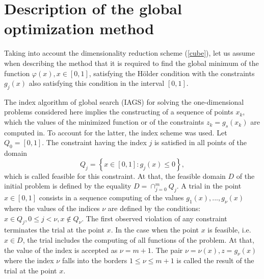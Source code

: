 \documentclass[runningheads]{llncs}
\begin{document}
\section{Description of the global optimization method}
\label{sec:method}

Taking into account the dimensionality reduction scheme (\ref{cube}), let us assume when
describing the method that it is required to find the global minimum of the function \(\varphi(x),
x\in[0,1]\), satisfying the H\"{o}lder condition with the constraints \(g_j(x)\) also satisfying this
condition in the interval \([0,1]\).

The index algorithm of global search (IAGS) for solving the one-dimensional problems
considered here implies the constructing of a sequence of points
\(x_k\), which the values of the minimized function or of the constraints \(z_k = g_s(x_k)\) are
computed in.
To account for the latter, the index scheme \cite{Strongin2000} was used.
Let \(Q_0=[0,1]\). The constraint having the index \(j\) is satisfied in all points of the domain
\begin{displaymath}
  Q_j=\left\{x\in [0,1]:g_j(x)\leq 0\right\},
\end{displaymath}
which is called feasible for this constraint.
At that, the feasible domain \(D\) of the initial problem is defined by the equality
 \(D=\cap _{j=0}^{m}Q_{j}\).
A trial in the point \(x\in [0,1]\) consists in a sequence computing of the values
\(g_{1}(x),...,g_{\nu }(x)\)
where the values of the indices \(\nu\) are defined by the conditions:
\(x\in Q_{j},0\leqslant j<\nu ,x\notin Q_{\nu }\).
The first observed violation of any constraint terminates the trial at the point \(x\).
In the case when the point \(x\) is feasible, i.e. \(x\in D\), the trial includes the computing of all
functions of the problem.
At that, the value of the index is accepted as \(\nu =m+1\).
The pair \(\nu =\nu (x), z=g_{\nu }(x)\) where the index \(\nu\) falls into the borders \(1\leqslant
\nu \leqslant m+1\) is called the result of the trial at the point \(x\).
\end{document}
